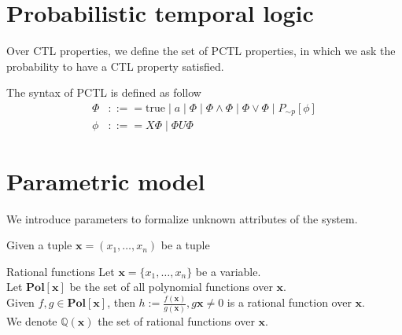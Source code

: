 \section{Probabilistic temporal logic}
Over CTL properties, we define the set of PCTL properties, in which we ask the probability to have a CTL property satisfied.
\begin{definition} The syntax of PCTL is defined as follow
    \begin{align*}
        \Phi & ::== \text{true} \;|\; a \;|\; \Phi \;|\; \Phi \wedge \Phi \;|\; \Phi \vee \Phi \;|\;  P_{\sim  p}[\phi] \\
        \phi & ::== X\Phi \;|\; \Phi U \Phi
    \end{align*}
\end{definition}


\section{Parametric model}
We introduce parameters to formalize unknown attributes of the system.
\begin{definition}
    Given a tuple $\mathbf{x}=(x_1,\ldots,x_n)$ be a tuple
\end{definition}

\begin{definition}{Rational functions}
    Let $\mathbf{x}=\{x_1,\ldots,x_n\}$ be a variable.\\
    Let $\mathbf{Pol}[\mathbf{x}]$ be the set of all polynomial functions over $\mathbf{x}$.\\
    Given $f,g\in\mathbf{Pol}[\mathbf{x}]$, then $h:=\frac{f(\mathbf{x})}{g(\mathbf{x})}, g{\mathbf{x}}\neq 0$ is a rational function over $\mathbf{x}$.\\
    We denote $\mathbb{Q}(\mathbf{x})$ the set of rational functions over $\mathbf{x}$.
\end{definition}


